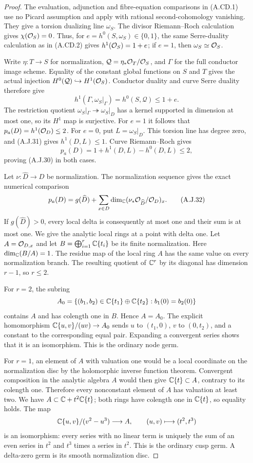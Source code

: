 \begin{proof}
The evaluation, adjunction and fibre-equation comparisons
in (A.CD.1) use no Picard assumption and apply with
rational second-cohomology vanishing. They give a torsion
dualizing line $\omega_S$. The divisor Riemann--Roch
calculation gives $\chi(\mathcal O_S)=0$. Thus, for
$e=h^0(S,\omega_S)\in\{0,1\}$, the same Serre-duality
calculation as in (A.CD.2) gives
$h^1(\mathcal O_S)=1+e$; if $e=1$, then
$\omega_S\simeq\mathcal O_S$.

Write $\eta:T\to S$ for normalization,
$\mathcal Q=\eta_*\mathcal O_T/\mathcal O_S$, and $\Gamma$ for
the full conductor image scheme. Equality of the
constant global functions on $S$ and $T$ gives the
actual injection $H^0(\mathcal Q)\hookrightarrow
H^1(\mathcal O_S)$. Conductor duality and curve Serre duality
therefore give
\[
 h^1(\Gamma,\omega_S|_\Gamma)
       =h^0(S,\mathcal Q)\le1+e.                  \tag{A.J.31}
\]
The restriction quotient
$\omega_S|_\Gamma\twoheadrightarrow\omega_S|_D$
has a kernel supported in dimension at most one, so
its $H^1$ map is surjective. For $e=1$ it follows that
$p_a(D)=h^1(\mathcal O_D)\le2$. For $e=0$, put
$L=\omega_S|_D$. This torsion line has degree zero,
and (A.J.31) gives $h^1(D,L)\le1$. Curve
Riemann--Roch gives
\[
 p_a(D)=1+h^1(D,L)-h^0(D,L)\le2,
\]
proving (A.J.30) in both cases.

Let $\nu:\widehat D\to D$ be normalization. The
normalization sequence gives the exact numerical
comparison
\[
 p_a(D)=g(\widehat D)+
        \sum_{x\in D}\dim_{\mathbb C}
          (\nu_*\mathcal O_{\widehat D}/\mathcal O_D)_x.       \tag{A.J.32}
\]
If $g(\widehat D)>0$, every local delta is consequently
at most one and their sum is at most one. We give the
analytic local rings at a point with delta one.
Let $A=\mathcal O_{D,x}$ and let
$B=\bigoplus_{i=1}^r\mathbb C\{t_i\}$ be its finite
normalization. Here $\dim_{\mathbb C}(B/A)=1$. The residue map
of the local ring $A$ has the same value on every
normalization branch. The resulting quotient of
$\mathbb C^r$ by its diagonal has dimension $r-1$, so
$r\le2$.

For $r=2$, the subring
\[
 A_0=\{(b_1,b_2)\in\mathbb C\{t_1\}\oplus\mathbb C\{t_2\}:
                                  b_1(0)=b_2(0)\}
\]
contains $A$ and has colength one in $B$. Hence
$A=A_0$. The explicit homomorphism
$\mathbb C\{u,v\}/(uv)\to A_0$ sends
$u$ to $(t_1,0)$, $v$ to $(0,t_2)$, and a constant
to the corresponding equal pair. Expanding a
convergent series shows that it is an isomorphism.
This is the ordinary node germ.

For $r=1$, an element of $A$ with valuation one would
be a local coordinate on the normalization disc by
the holomorphic inverse function theorem. Convergent
composition in the analytic algebra $A$ would then
give $\mathbb C\{t\}\subset A$, contrary to its colength
one. Therefore every nonconstant element of $A$ has
valuation at least two. We have
$A\subset\mathbb C+t^2\mathbb C\{t\}$; both rings have
colength one in $\mathbb C\{t\}$, so equality holds.
The map
\[
 \mathbb C\{u,v\}/(v^2-u^3)\longrightarrow A,
                 \qquad (u,v)\longmapsto(t^2,t^3)
\]
is an isomorphism: every series with no linear term
is uniquely the sum of an even series in $t^2$ and
$t^3$ times a series in $t^2$. This is the ordinary
cusp germ. A delta-zero germ is its smooth
normalization disc.


\end{proof}
